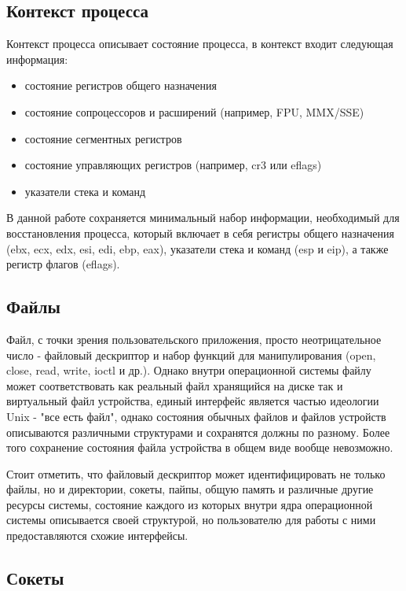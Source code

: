 \subsection{Контекст процесса}

Контекст процесса описывает состояние процесса, в контекст входит следующая информация:

\begin{itemize}

    \item состояние регистров общего назначения
    \item состояние сопроцессоров и расширений (например, FPU, MMX/SSE)
    \item состояние сегментных регистров
    \item состояние управляющих регистров (например, cr3 или eflags)
    \item указатели стека и команд

\end{itemize}

В данной работе сохраняется минимальный набор информации, необходимый для восстановления процесса, который включает в себя регистры общего назначения (ebx, ecx, edx, esi, edi, ebp, eax), указатели стека и команд (esp и eip), а также регистр флагов (eflags).

\subsection{Файлы}

Файл, с точки зрения пользовательского приложения, просто неотрицательное число - файловый дескриптор и набор функций для манипулирования (open, close, read, write, ioctl и др.). Однако внутри операционной системы файлу может соответствовать как реальный файл хранящийся на диске так и виртуальный файл устройства, единый интерфейс является частью идеологии Unix - "все есть файл", однако состояния обычных файлов и файлов устройств описываются различными структурами и сохранятся должны по разному. Более того сохранение состояния файла устройства в общем виде вообще невозможно.

Стоит отметить, что файловый дескриптор может идентифицировать не только файлы, но и директории, сокеты, пайпы, общую память и различные другие ресурсы системы, состояние каждого из которых внутри ядра операционной системы описывается своей структурой, но пользователю для работы с ними предоставляются схожие интерфейсы.


\subsection{Сокеты}

